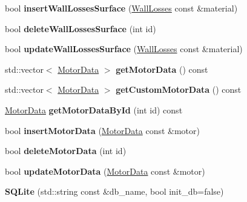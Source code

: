 \begin{DoxyCompactItemize}
bool {\bfseries insert\+Wall\+Losses\+Surface} (\hyperlink{class_wall_losses}{Wall\+Losses} const \&material)
\item 
\mbox{\label{class_s_q_lite_ab9492a672cb89dfeae330b99ea03ceeb}} 
bool {\bfseries delete\+Wall\+Losses\+Surface} (int id)
\item 
\mbox{\label{class_s_q_lite_ac4b7397ef51a0544d38f670ef995f26e}} 
bool {\bfseries update\+Wall\+Losses\+Surface} (\hyperlink{class_wall_losses}{Wall\+Losses} const \&material)
\item 
\mbox{\label{class_s_q_lite_a654ac1320d5629702346f55f99a648c9}} 
std\+::vector$<$ \hyperlink{class_motor_data}{Motor\+Data} $>$ {\bfseries get\+Motor\+Data} () const
\item 
\mbox{\label{class_s_q_lite_a40f0107a78cdb8d735242d954da87ac7}} 
std\+::vector$<$ \hyperlink{class_motor_data}{Motor\+Data} $>$ {\bfseries get\+Custom\+Motor\+Data} () const
\item 
\mbox{\label{class_s_q_lite_a4b0a99992e2909216b40dc499c86a028}} 
\hyperlink{class_motor_data}{Motor\+Data} {\bfseries get\+Motor\+Data\+By\+Id} (int id) const
\item 
\mbox{\label{class_s_q_lite_a38eb0f1501e0918c267a9ab3a0953a54}} 
bool {\bfseries insert\+Motor\+Data} (\hyperlink{class_motor_data}{Motor\+Data} const \&motor)
\item 
\mbox{\label{class_s_q_lite_ab1f59cd24e3931970bc39079b0a5e612}} 
bool {\bfseries delete\+Motor\+Data} (int id)
\item 
\mbox{\label{class_s_q_lite_a7909128eed1b0612ecdf7c50edf1426a}} 
bool {\bfseries update\+Motor\+Data} (\hyperlink{class_motor_data}{Motor\+Data} const \&motor)
\item 
\mbox{\label{class_s_q_lite_a758f334ed7e72820f4f0e83d2b707625}} 
{\bfseries S\+Q\+Lite} (std\+::string const \&db\+\_\+name, bool init\+\_\+db=false)
\item 
\mbox{\label{class_s_q_lite_af6195f55e9658c24a8f14b884e490acb}} 

\end{DoxyCompactItemize}
